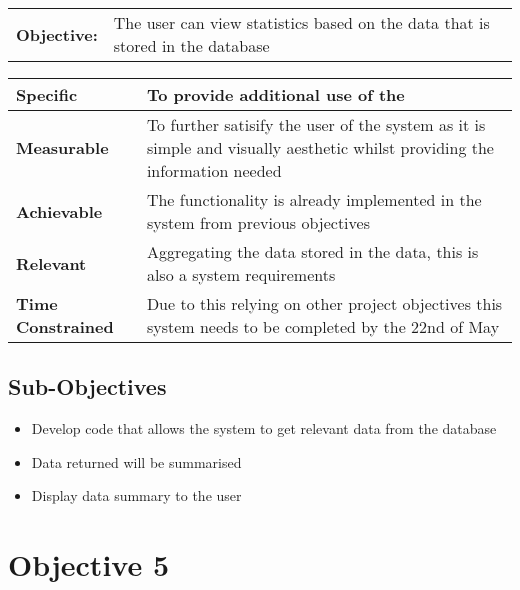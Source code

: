 \begin{table}[H]
    \begin{tabularx}{\textwidth}{| l | X |}
        \hline
        \textbf{Objective:} & The user can view statistics based on the data that is stored in the database \\
    \end{tabularx}
    \begin{tabularx}{\textwidth}{| l | X |}
        \hline
        \textbf{Specific} & To provide additional use of the \\ \hline
        \textbf{Measurable} & To further satisify the user of the system as it is simple and visually aesthetic whilst providing the information needed\\ \hline
        \textbf{Achievable} &  The functionality is already implemented in the system from previous objectives\\ \hline
        \textbf{Relevant} & Aggregating the data stored in the data, this is also a system requirements  \\ \hline
        \textbf{Time Constrained} & Due to this relying on other project objectives this system needs to be completed by the 22nd of May \\ \hline
    \end{tabularx}
\end{table}

\subsection{Sub-Objectives}

	\begin{itemize}
		\item Develop code that allows the system to get relevant data from the database
		\item Data returned will be summarised
		\item Display data summary to the user
	\end{itemize}

\section{Objective 5}

